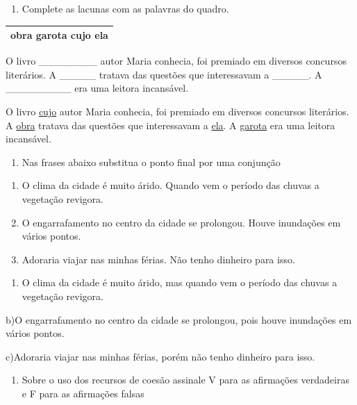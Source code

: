 {\begin{enumerate}
\def\labelenumi{\arabic{enumi})}
\setcounter{enumi}{7}
\tightlist
\item
  Complete as lacunas com as palavras do quadro.
\end{enumerate}

\begin{longtable}[]{@{}l@{}}
\toprule
\endhead
obra garota cujo ela \\
\bottomrule
\end{longtable}

O livro \_\_\_\_\_\_\_\_ autor Maria conhecia, foi premiado em diversos
concursos literários. A \_\_\_\_\_ tratava das questões que interessavam
a \_\_\_\_\_. A \_\_\_\_\_\_\_\_\_ era uma leitora incansável.

O livro \uline{cujo} autor Maria conhecia, foi premiado em diversos
concursos literários. A \uline{obra} tratava das questões que
interessavam a \uline{ela}. A \uline{garota} era uma leitora incansável.

\begin{enumerate}
\def\labelenumi{\arabic{enumi})}
\setcounter{enumi}{8}
\tightlist
\item
  Nas frases abaixo substitua o ponto final por uma conjunção
\end{enumerate}

\begin{enumerate}
\def\labelenumi{\alph{enumi})}
\item
  O clima da cidade é muito árido. Quando vem o período das chuvas a
  vegetação revigora.
\item
  O engarrafamento no centro da cidade se prolongou. Houve inundações em
  vários pontos.
\item
  Adoraria viajar nas minhas férias. Não tenho dinheiro para isso.
\end{enumerate}

\begin{enumerate}
\def\labelenumi{\arabic{enumi}.}
\tightlist
\item
  O clima da cidade é muito árido, mas quando vem o período das chuvas a
  vegetação revigora.
\end{enumerate}

b)O engarrafamento no centro da cidade se prolongou, pois houve
inundações em vários pontos.

c)Adoraria viajar nas minhas férias, porém não tenho dinheiro para isso.

\begin{enumerate}
\def\labelenumi{\arabic{enumi})}
\setcounter{enumi}{9}
\tightlist
\item
  Sobre o uso dos recursos de coesão assinale V para as afirmações
  verdadeiras e F para as afirmações falsas
\end{enumerate}

}
